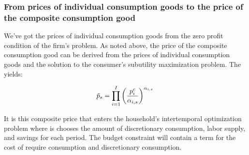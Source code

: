 \documentclass[letterpaper,12pt]{article}
\theoremstyle{definition}
\begin{document}
\begin{spacing}{1.5}
\subsubsection*{From prices of individual consumption goods to the price of the composite consumption good}

We've got the prices of individual consumption goods from the zero profit condition of the firm's problem.  As noted above, the price of the composite consumption good can be derived from the prices of individual consumption goods and the solution to the consumer's subutility maximization problem.  The yields:

\begin{equation} \label{eqn:composite_price2}
\tilde{p}_{s} =  \prod_{i=1}^{I}\left( \frac{p^{c}_{i}}{\alpha_{i,s}} \right)^{\alpha_{i,s}} \\
\end{equation}

It is this composite price that enters the household's intertemporal optimization problem where is chooses the amount of discretionary consumption, labor supply, and savings for each period.  The budget constraint will contain a term for the cost of require consumption and discretionary consumption.  


%
%
%
%
%
%


\end{spacing}
\end{document}

